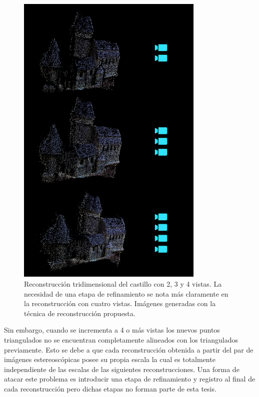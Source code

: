 \begin{figure}[H]
\centering
\includegraphics[width=0.8\textwidth]{images/castle234.png}
\caption[Reconstrucci\'{o}n del casillo con 2, 3 y 4 vistas]%
{Reconstrucci\'{o}n tridimensional del castillo con 2, 3 y 4 vistas. La necesidad de una etapa de refinamiento se nota m\'{a}s claramente en la reconstrucci\'{o}n con cuatro vistas. Im\'{a}genes generadas con la t\'{e}cnica de reconstrucción propuesta.}
\label{fig:Castle234}
\end{figure}


Sin embargo, cuando se incrementa a 4 o m\'{a}s vistas los nuevos puntos triangulados no se encuentran completamente alineados con los triangulados previamente. Esto se debe a que cada reconstrucci\'{o}n obtenida a partir del par de im\'{a}genes estereosc\'{o}picas posee su propia escala la cual es totalmente independiente de las escalas de las siguientes reconstrucciones. Una forma de atacar este problema es introducir una etapa de refinamiento y registro al final de cada reconstrucci\'{o}n pero dichas etapas no forman parte de esta tesis.

